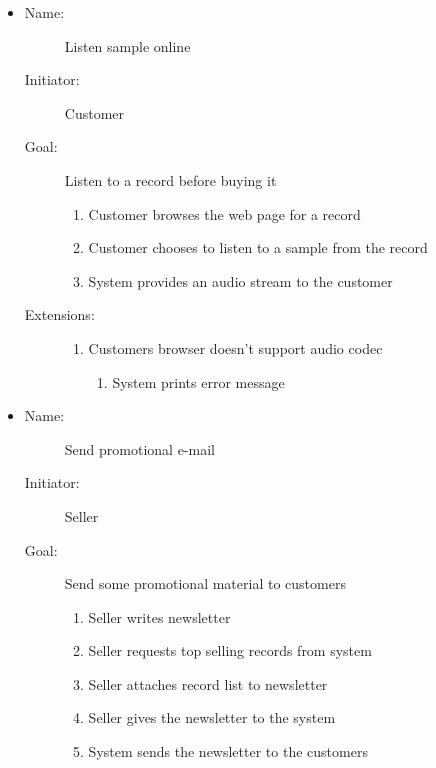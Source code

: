 \documentclass[12pt, titlepage, a4paper]{article}
\begin{document}
\begin{description}
\begin{itemize}
    \item
        \begin{description}
            \item[Name:]Listen sample online 
            \item[Initiator:]Customer
            \item[Goal:]Listen to a record before buying it
            \begin{enumerate}
                \item Customer browses the web page for a record
                \item Customer chooses to listen to a sample from the record
                \item System provides an audio stream to the customer
            \end{enumerate}
    	    \item[Extensions:] \hfil
	    \begin{enumerate}
		\item Customers browser doesn't support audio codec
		\begin{enumerate}
			\item System prints error message
		\end{enumerate}
	    \end{enumerate}
        \end{description}

    \item
        \begin{description}
            \item[Name:]Send promotional e-mail 
            \item[Initiator:]Seller
            \item[Goal:]Send some promotional material to customers 
	    \begin{enumerate}
		\item Seller writes newsletter
		\item Seller requests top selling records from system
		\item Seller attaches record list to newsletter
		\item Seller gives the newsletter to the system
		\item System sends the newsletter to the customers
		\end{enumerate}
        \end{description}


\end{itemize}
\end{description}
\end{document}
